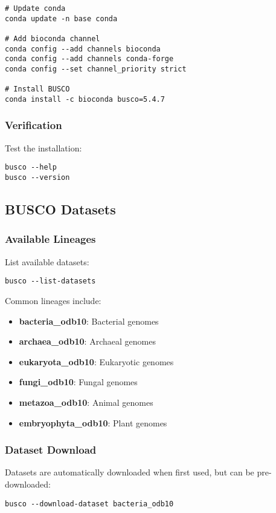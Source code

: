 \begin{verbatim}
# Update conda
conda update -n base conda

# Add bioconda channel
conda config --add channels bioconda
conda config --add channels conda-forge
conda config --set channel_priority strict

# Install BUSCO
conda install -c bioconda busco=5.4.7
\end{verbatim}

\subsubsection{Verification}
Test the installation:
\begin{verbatim}
busco --help
busco --version
\end{verbatim}

\subsection{BUSCO Datasets}

\subsubsection{Available Lineages}
List available datasets:
\begin{verbatim}
busco --list-datasets
\end{verbatim}

Common lineages include:
\begin{itemize}
    \item \textbf{bacteria\_odb10}: Bacterial genomes
    \item \textbf{archaea\_odb10}: Archaeal genomes
    \item \textbf{eukaryota\_odb10}: Eukaryotic genomes
    \item \textbf{fungi\_odb10}: Fungal genomes
    \item \textbf{metazoa\_odb10}: Animal genomes
    \item \textbf{embryophyta\_odb10}: Plant genomes
\end{itemize}

\subsubsection{Dataset Download}
Datasets are automatically downloaded when first used, but can be pre-downloaded:
\begin{verbatim}
busco --download-dataset bacteria_odb10
\end{verbatim}

